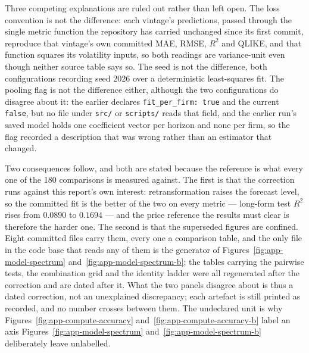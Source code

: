 Three competing explanations are ruled out rather than left open. The loss
convention is not the difference: each vintage's predictions, passed through
the single metric function the repository has carried unchanged since its first
commit, reproduce that vintage's own committed MAE, RMSE, $R^{2}$ and QLIKE,
and that function squares its volatility inputs, so both readings are
variance-unit even though neither source table says so. %
The seed is not the difference, both configurations recording seed 2026 over a
deterministic least-squares fit. The pooling flag is not the difference either,
although the two configurations do disagree about it: the earlier declares
\texttt{fit\_per\_firm: true} and the current \texttt{false}, but no file under
\texttt{src/} or \texttt{scripts/} reads that field, and the earlier run's saved
model holds one coefficient vector per horizon and none per firm, so the flag
recorded a description that was wrong rather than an estimator that
changed. %

Two consequences follow, and both are stated because the reference is what
every one of the 180 comparisons is measured against. The first is that the
correction runs against this report's own interest: retransformation raises the
forecast level, so the committed fit is the better of the two on every metric
--- long-form test $R^{2}$ rises from $0.0890$ to $0.1694$ --- and the price
reference the results must clear is therefore the harder one. The second is
that the superseded figures are confined. Eight committed files carry them,
every one a comparison table, and the only file in the code base that reads any
of them is the generator of Figures~\ref{fig:app-model-spectrum}
and~\ref{fig:app-model-spectrum-b}; the tables carrying the pairwise tests, the
combination grid and the identity ladder were all regenerated after the
correction and are dated after it. %
What the two panels disagree about is thus a dated correction, not an
unexplained discrepancy; each artefact is still printed as recorded, and no
number crosses between them.
The undeclared unit is why
Figures~\ref{fig:app-compute-accuracy} and~\ref{fig:app-compute-accuracy-b} label an axis
Figures~\ref{fig:app-model-spectrum} and~\ref{fig:app-model-spectrum-b} deliberately leave unlabelled.

